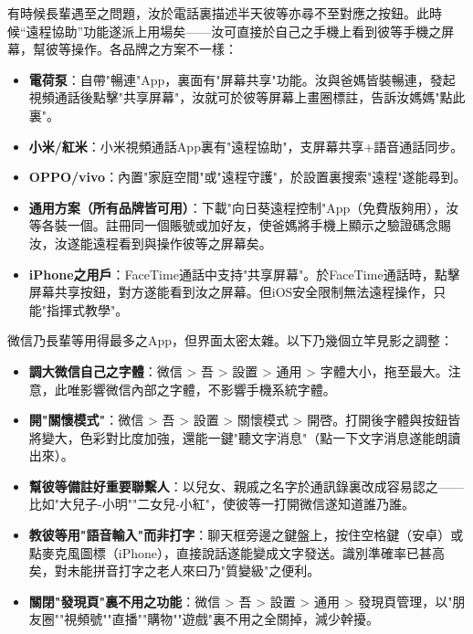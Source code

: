 
有時候長輩遇至之問題，汝於電話裏描述半天彼等亦尋不至對應之按鈕。此時候“遠程協助”功能遂派上用場矣——汝可直接於自己之手機上看到彼等手機之屏幕，幫彼等操作。各品牌之方案不一樣：

\begin{itemize}
  \item \textbf{電荷泵}：自帶"暢連"App，裏面有"屏幕共享"功能。汝與爸媽皆裝暢連，發起視頻通話後點擊"共享屏幕"，汝就可於彼等屏幕上畫圈標註，告訴汝媽媽"點此裏"。
  \item \textbf{小米/紅米}：小米視頻通話App裏有"遠程協助"，支屏幕共享+語音通話同步。
  \item \textbf{OPPO/vivo}：內置"家庭空間"或"遠程守護"，於設置裏搜索"遠程"遂能尋到。
  \item \textbf{通用方案（所有品牌皆可用）}：下載"向日葵遠程控制"App（免費版夠用），汝等各裝一個。註冊同一個賬號或加好友，使爸媽將手機上顯示之驗證碼念賜汝，汝遂能遠程看到與操作彼等之屏幕矣。
  \item \textbf{iPhone之用戶}：FaceTime通話中支持"共享屏幕"。於FaceTime通話時，點擊屏幕共享按鈕，對方遂能看到汝之屏幕。但iOS安全限制無法遠程操作，只能"指揮式教學"。
\end{itemize}


微信乃長輩等用得最多之App，但界面太密太雜。以下乃幾個立竿見影之調整：

\begin{itemize}
  \item \textbf{調大微信自己之字體}：微信 > 吾 > 設置 > 通用 > 字體大小，拖至最大。注意，此唯影響微信內部之字體，不影響手機系統字體。
  \item \textbf{開"關懷模式"}：微信 > 吾 > 設置 > 關懷模式 > 開啓。打開後字體與按鈕皆將變大，色彩對比度加強，還能一鍵"聽文字消息"（點一下文字消息遂能朗讀出來）。
  \item \textbf{幫彼等備註好重要聯繫人}：以兒女、親戚之名字於通訊錄裏改成容易認之——比如"大兒子-小明""二女兒-小紅"，使彼等一打開微信遂知道誰乃誰。
  \item \textbf{教彼等用"語音輸入"而非打字}：聊天框旁邊之鍵盤上，按住空格鍵（安卓）或點麥克風圖標（iPhone），直接說話遂能變成文字發送。識別準確率已甚高矣，對未能拼音打字之老人來曰乃"質變級"之便利。
  \item \textbf{關閉"發現頁"裏不用之功能}：微信 > 吾 > 設置 > 通用 > 發現頁管理，以"朋友圈""視頻號""直播""購物""遊戲"裏不用之全關掉，減少幹擾。
\end{itemize}

